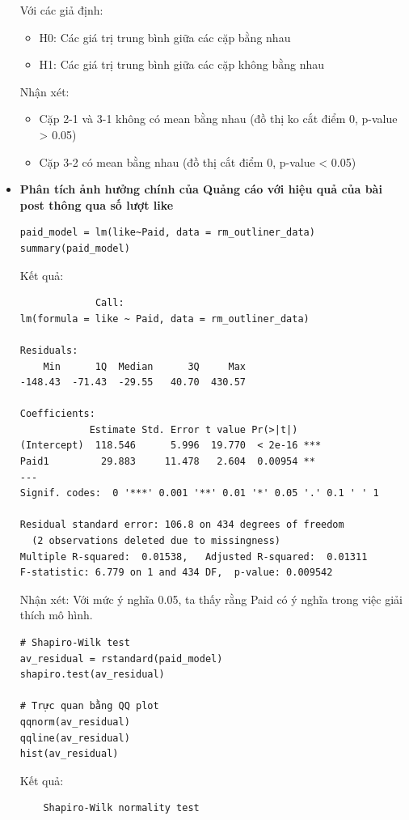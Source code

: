 \begin{itemize}
    Với các giả định:
        \begin{itemize}
            \item H0: Các giá trị trung bình giữa các cặp bằng nhau
            \item H1: Các giá trị trung bình giữa các cặp không bằng nhau
        \end{itemize}
    Nhận xét: \begin{itemize}
        \item Cặp 2-1 và 3-1 không có mean bằng nhau (đồ thị ko cắt điểm 0, p-value > 0.05)
        \item Cặp 3-2 có mean bằng nhau (đồ thị cắt điểm 0, p-value < 0.05)
    \end{itemize}

    \item \textbf{Phân tích ảnh hưởng chính của Quảng cáo với hiệu quả của bài post thông qua số lượt like}
    \begin{lstlisting}
paid_model = lm(like~Paid, data = rm_outliner_data)
summary(paid_model)
    \end{lstlisting}
    Kết quả:
    \begin{lstlisting}
             Call:
lm(formula = like ~ Paid, data = rm_outliner_data)

Residuals:
    Min      1Q  Median      3Q     Max 
-148.43  -71.43  -29.55   40.70  430.57 

Coefficients:
            Estimate Std. Error t value Pr(>|t|)    
(Intercept)  118.546      5.996  19.770  < 2e-16 ***
Paid1         29.883     11.478   2.604  0.00954 ** 
---
Signif. codes:  0 '***' 0.001 '**' 0.01 '*' 0.05 '.' 0.1 ' ' 1

Residual standard error: 106.8 on 434 degrees of freedom
  (2 observations deleted due to missingness)
Multiple R-squared:  0.01538,	Adjusted R-squared:  0.01311 
F-statistic: 6.779 on 1 and 434 DF,  p-value: 0.009542
    \end{lstlisting}
    Nhận xét: Với mức ý nghĩa 0.05, ta thấy rằng Paid có ý nghĩa trong việc giải thích mô hình.
    \begin{lstlisting}
# Shapiro-Wilk test
av_residual = rstandard(paid_model)
shapiro.test(av_residual)

# Trực quan bằng QQ plot
qqnorm(av_residual)
qqline(av_residual)
hist(av_residual)
    \end{lstlisting}

    Kết quả:
    \begin{lstlisting}
	Shapiro-Wilk normality test


\end{lstlisting}
\end{itemize}
